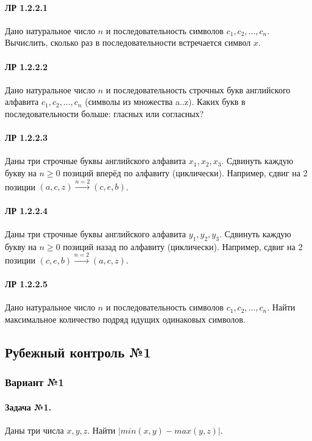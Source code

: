 \documentclass[12pt,a4paper]{report}
\begin{document}
\paragraph*{ЛР 1.2.2.1} Дано натуральное число $n$ и последовательность символов $c_1, c_2, ..., c_n$. Вычислить, сколько раз в последовательности встречается символ $x$.
\paragraph*{ЛР 1.2.2.2} Дано натуральное число $n$ и последовательность строчных букв английского алфавита $c_1, c_2, ..., c_n$ (символы из множества a..z). Каких букв в последовательности больше: гласных или согласных?
\paragraph*{ЛР 1.2.2.3} Даны три строчные буквы английского алфавита $x_1, x_2, x_3 $. Сдвинуть каждую букву на $n \ge 0$ позиций вперёд по алфавиту (циклически). Например, сдвиг на 2 позиции $(a, c, z) \xrightarrow{n=2} (c, e, b)$.
\paragraph*{ЛР 1.2.2.4} Даны три строчные буквы английского алфавита $y_1, y_2, y_3 $. Сдвинуть каждую букву на $n \ge 0$ позиций назад по алфавиту (циклически). Например, сдвиг на 2 позиции $(c, e, b) \xrightarrow{n=2} (a, c, z)$.
\paragraph*{ЛР 1.2.2.5} Дано натуральное число $n$ и последовательность символов $c_1, c_2, ..., c_n$. Найти максимальное количество подряд идущих одинаковых символов.



\clearpage
\subsection*{Рубежный контроль №1}
\subsubsection*{Вариант №1}
\paragraph*{Задача №1.} Даны три числа $x, y, z$. Найти $|min(x, y) - max(y, z)|$.
\end{document}
